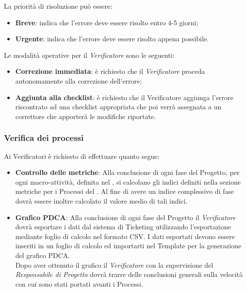 {La priorità di risoluzione può essere:
\begin{itemize}
\item \textbf{Breve}: indica che l’errore deve essere risolto entro 4-5 giorni;
\item \textbf{Urgente}: indica che l’errore deve essere risolto appena possibile.
\end{itemize}
Le modalità operative per il \emph{Verificatore} sono le seguenti:
\begin{itemize}
\item \textbf{Correzione immediata}: è richiesto che il \emph{Verificatore} proceda autonomamente alla correzione dell’errore;
\item \textbf{Aggiunta alla checklist}: è richiesto che il Verificatore aggiunga l’errore riscontrato ad una checklist appropriata che poi verrà assegnata a un correttore che apporterà le modifiche riportate.
\end{itemize}
\subsubsection{Verifica dei processi}
Ai Verificatori è richiesto di effettuare quanto segue:
\begin{itemize}
\item \textbf{Controllo delle metriche}: Alla conclusione di ogni fase del Progetto, per ogni
macro-attività, definita nel \href{run:../../Esterni/\fPianoDiProgetto}{\fEscapePianoDiProgetto} , si calcolano gli indici definiti
nella sezione metriche per i Processi del \href{run:../../Esterni/\fPianoDiQualifica}{\fEscapePianoDiQualifica} . Al fine di avere
un indice complessivo di fase dovrà essere inoltre calcolato il valore medio di tali indici.

\item \textbf{Grafico PDCA}: Alla conclusione di ogni fase del Progetto il \emph{Verificatore} dovrà esportare i dati dal sistema di Ticketing utilizzando l’esportazione mediante foglio di calcolo nel formato CSV. I dati esportati devono essere inseriti in un foglio di calcolo ed importarti nel Template per la generazione del grafico PDCA.\\
Dopo aver ottenuto il grafico il \emph{Verificatore} con la supervisione del \emph{Responsabile di Progetto} dovrà trarre delle conclusioni generali sulla velocità con cui sono stati portati avanti i Processi.
\end{itemize}

}
